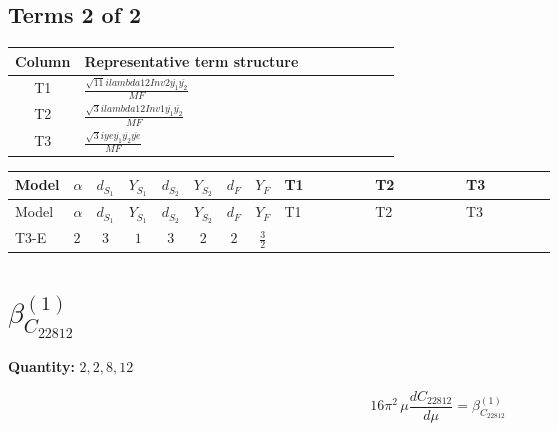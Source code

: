 \documentclass[8pt]{article}
\begin{document}
\begin{landscape}
\subsection*{Terms 2 of 2}
\begin{center}
\begin{tabular}{@{}c >{\raggedright\arraybackslash}p{0.82\linewidth}@{}}
\toprule
Column & Representative term structure \\
\midrule
T1 & \(\displaystyle \frac{\sqrt{11} i lambda12Inv2 \overline{y_{1}} \overline{y_{2}}}{MF}\) \\
\midrule
T2 & \(\displaystyle \frac{\sqrt{3} i lambda12Inv1 \overline{y_{1}} \overline{y_{2}}}{MF}\) \\
\midrule
T3 & \(\displaystyle \frac{\sqrt{3} i ye \overline{y_{1}} \overline{y_{2}} \overline{ye}}{MF}\) \\
\midrule
\bottomrule
\end{tabular}
\end{center}
\smallskip
\tiny
\begin{longtable}{@{}llcccccc >{\raggedright\arraybackslash}p{0.21\linewidth} >{\raggedright\arraybackslash}p{0.21\linewidth} >{\raggedright\arraybackslash}p{0.21\linewidth}@{}}
\toprule
Model & $\alpha$ & $d_{S_1}$ & $Y_{S_1}$ & $d_{S_2}$ & $Y_{S_2}$ & $d_F$ & $Y_F$ & T1 & T2 & T3 \\
\midrule
\endfirsthead
\toprule
Model & $\alpha$ & $d_{S_1}$ & $Y_{S_1}$ & $d_{S_2}$ & $Y_{S_2}$ & $d_F$ & $Y_F$ & T1 & T2 & T3 \\
\midrule
\endhead
T3-E & $2$ & $3$ & $1$ & $3$ & $2$ & $2$ & $\frac{3}{2}$ & \scriptsize\adjustbox{max width=\linewidth}{$\begin{gathered} - \frac{3 \sqrt{11} i lambda12Inv2 \overline{y_{1}} \overline{y_{2}}}{22 MF}\end{gathered}$} & \scriptsize\adjustbox{max width=\linewidth}{$\begin{gathered} \frac{\sqrt{3} i lambda12Inv1 \overline{y_{1}} \overline{y_{2}}}{6 MF}\end{gathered}$} & \scriptsize\adjustbox{max width=\linewidth}{$\begin{gathered} \frac{\sqrt{3} i ye \overline{y_{1}} \overline{y_{2}} \overline{ye}}{12 MF}\end{gathered}$} \\
\midrule
\bottomrule
\end{longtable}
\clearpage
\section*{$\beta_{C_{22812}}^{(1)}$}
\noindent\textbf{Quantity: }$\mathrm{2,2,8,12}$\par\smallskip
\[16\pi^2\,\mu\frac{d C_{22812}}{d\mu}=\beta_{C_{22812}}^{(1)}\]

\end{landscape}
\end{document}
